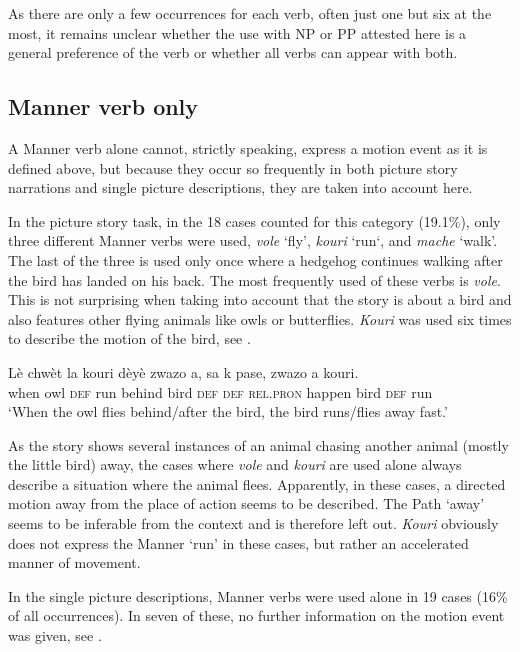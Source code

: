 \documentclass[output=paper,colorlinks,citecolor=brown]{langscibook}
\begin{document}
As there are only a few occurrences for each verb, often just one but six at the most, it remains unclear whether the use with NP or PP attested here is a general preference of the verb or whether all verbs can appear with both.

\subsection{Manner verb only}

A Manner verb alone cannot, strictly speaking, express a motion event as it is defined above, but because they occur so frequently in both picture story narrations and single picture descriptions, they are taken into account here.

In the picture story task, in the 18 cases counted for this category (19.1\%), only three different Manner verbs were used, \emph{vole} ‘fly’, \emph{kouri} ‘run‘, and \emph{mache} ‘walk’. The last of the three is used only once where a hedgehog continues walking after the bird has landed on his back. The most frequently used of these verbs is \emph{vole}. This is not surprising when taking into account that the story is about a bird and also features other flying animals like owls or butterflies. \emph{Kouri} was used six times to describe the motion of the bird, see .

\ea\label{ex:3:45}
\gll Lè chwèt la kouri dèyè zwazo a, sa k pase, zwazo a kouri.\\
     when owl \textsc{def} run behind bird \textsc{def} \textsc{def} \textsc{rel.pron} happen bird \textsc{def} run \\        
\glt ‘When the owl flies behind/after the bird, the bird runs/flies away fast.’
\z

As the story shows several instances of an animal chasing another animal (mostly the little bird) away, the cases where \emph{vole} and \emph{kouri} are used alone always describe a situation where the animal flees. Apparently, in these cases, a directed motion away from the place of action seems to be described. The Path ‘away’ seems to be inferable from the context and is therefore left out. \emph{Kouri} obviously does not express the Manner ‘run’ in these cases, but rather an accelerated manner of movement.

In the single picture descriptions, Manner verbs were used alone in 19 cases (16\% of all occurrences). In seven of these, no further information on the motion event was given, see .
\end{document}
